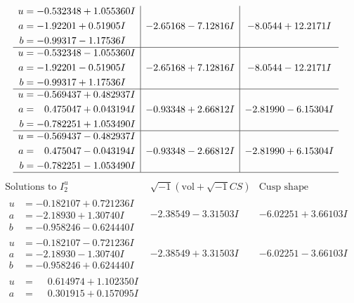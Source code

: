 \documentclass[1p]{elsarticle_modified}
\theoremstyle{definition}
\newcommand{\I}{\sqrt{-1}}
\begin{document}
$$\begin{array}{c|c|c}
\begin{aligned}
u &= -0.532348 + 1.055360 I \\
a &= -1.92201 + 0.51905 I \\
b &= -0.99317 - 1.17536 I\end{aligned}
 & -2.65168 - 7.12816 I & -8.0544 + 12.2171 I \\ \hline\begin{aligned}
u &= -0.532348 - 1.055360 I \\
a &= -1.92201 - 0.51905 I \\
b &= -0.99317 + 1.17536 I\end{aligned}
 & -2.65168 + 7.12816 I & -8.0544 - 12.2171 I \\ \hline\begin{aligned}
u &= -0.569437 + 0.482937 I \\
a &= \phantom{-}0.475047 + 0.043194 I \\
b &= -0.782251 + 1.053490 I\end{aligned}
 & -0.93348 + 2.66812 I & -2.81990 - 6.15304 I \\ \hline\begin{aligned}
u &= -0.569437 - 0.482937 I \\
a &= \phantom{-}0.475047 - 0.043194 I \\
b &= -0.782251 - 1.053490 I\end{aligned}
 & -0.93348 - 2.66812 I & -2.81990 + 6.15304 I\\
 \hline 
 \end{array}$$\newpage$$\begin{array}{c|c|c}  
\text{Solutions to }I^u_{2}& \I (\text{vol} + \sqrt{-1}CS) & \text{Cusp shape}\\
 \hline 
\begin{aligned}
u &= -0.182107 + 0.721236 I \\
a &= -2.18930 + 1.30740 I \\
b &= -0.958246 - 0.624440 I\end{aligned}
 & -2.38549 - 3.31503 I & -6.02251 + 3.66103 I \\ \hline\begin{aligned}
u &= -0.182107 - 0.721236 I \\
a &= -2.18930 - 1.30740 I \\
b &= -0.958246 + 0.624440 I\end{aligned}
 & -2.38549 + 3.31503 I & -6.02251 - 3.66103 I \\ \hline\begin{aligned}
u &= \phantom{-}0.614974 + 1.102350 I \\
a &= \phantom{-}0.301915 + 0.157095 I \\

\end{aligned}
\end{array}$$
\end{document}
